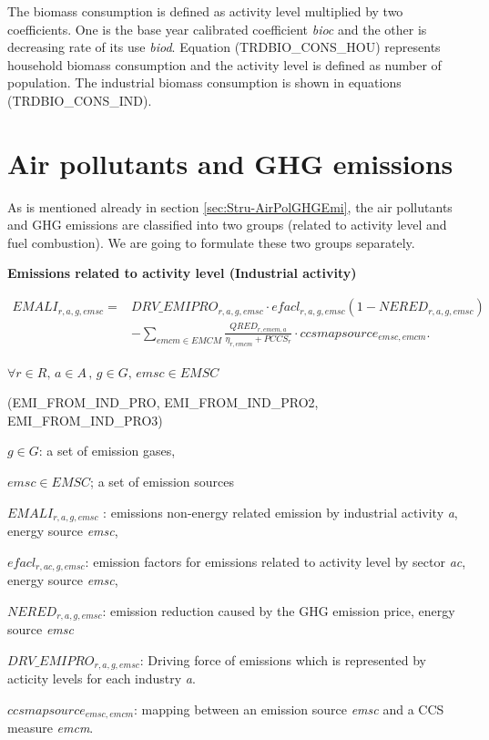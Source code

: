 \documentclass[10pt,a4paper,titlepage,dvipdfmx]{book}
\newif\ifAIMHubReviewMode
\newcommand{\changed}[1]{\ifAIMHubReviewMode{\color{red}#1}\else#1\fi}
\newenvironment{changedblock}{\begingroup\ifAIMHubReviewMode\color{red}\fi}{\endgroup}
\begin{document}
The biomass consumption is defined as activity level multiplied by two coefficients. One is the base year calibrated coefficient \textit{bioc} and the other is decreasing rate of its use \textit{biod}. Equation (TRDBIO\_CONS\_HOU) represents household biomass consumption and the activity level is defined as number of population. The industrial biomass consumption is shown in equations (TRDBIO\_CONS\_IND).

\section{\label{sec:Math-AirPolGHGEmi}Air pollutants and GHG emissions\label{mark-4.9.}}

As is mentioned already in section \ref{sec:Stru-AirPolGHGEmi}, the air pollutants and GHG emissions are classified into two groups (related to activity level and fuel combustion). We are going to formulate these two groups separately. 

\begin{flushleft}\textbf{Emissions related to activity level (Industrial activity)}\end{flushleft}


\begin{align*}
EMALI_{r,a,g,emsc}={}&DRV\_ EMIPRO_{r,a,g,emsc}\cdot efacl_{r,a,g,emsc}
\left(1-NERED_{r,a,g,emsc}\right)\\
&\changed{-\sum _{emcm\in EMCM}
\frac{QRED_{r,emcm,a}}{\eta_{r,emcm}+PCCS_{r}}\cdot ccsmapsource_{emsc,emcm}}.
\end{align*}


\begin{center}$\forall r\in R,\,a\in A\,,\,g\in G,\,emsc\in EMSC$    
\end{center}


\begin{flushright}(EMI\_FROM\_IND\_PRO, EMI\_FROM\_IND\_PRO2, EMI\_FROM\_IND\_PRO3)
\end{flushright}

\begin{flushleft}
$g\in G$: a set of emission gases,

$emsc\in EMSC$; a set of emission sources

$EMALI_{r,a,g,emsc}$ : emissions non-energy related emission by industrial activity \textit{a}, energy source \textit{emsc}, 

$efacl_{r,ac,g,emsc}$: emission factors for emissions related to activity level by sector \textit{ac}, energy source \textit{emsc},

$NERED_{r,a,g,emsc}$: emission reduction caused by the GHG emission price, energy source \textit{emsc}

$DRV\_EMIPRO_{r,a,g,emsc}$: Driving force of emissions which is represented by acticity levels for each industry \textit{a}.

\begin{changedblock}
$ccsmapsource_{emsc,emcm}$: mapping between an emission source \textit{emsc} and a CCS measure \textit{emcm}.
\end{changedblock}
\end{flushleft}
\end{document}
